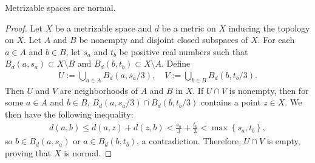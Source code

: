 \begin{thm}
    Metrizable spaces are normal.
\end{thm}
\begin{proof}
    Let $X$ be a metrizable space and $d$ be a metric on $X$ inducing the topology on $X$.
    Let $A$ and $B$ be nonempty and disjoint closed subspaces of $X$.
    For each $a\in A$ and $b\in B$, let $s_a$ and $t_b$ be positive real numbers such that $B_d(a, s_a)\subset X\setminus B$ and $B_d(b, t_b)\subset X\setminus A$.
    Define
    \begin{align*}
        U:=\bigcup_{a\in A}B_d(a, s_a/3),\quad V:=\bigcup_{b\in B}B_d(b, t_b/3).
    \end{align*}
    Then $U$ and $V$ are neighborhoods of $A$ and $B$ in $X$.
    If $U\cap V$ is nonempty, then for some $a\in A$ and $b\in B$, $B_d(a, s_a/3)\cap B_d(b, t_b/3)$ contains a point $z\in X$.
    We then have the following inequality:
    \begin{align*}
        d(a, b)\leq d(a, z)+d(z, b)<\frac{s_a}{3}+\frac{t_b}{3}<\max\left\{s_a, t_b\right\},
    \end{align*}
    so $b\in B_d(a, s_a)$ or $a\in B_d(b, t_b)$, a contradiction.
    Therefore, $U\cap V$ is empty, proving that $X$ is normal.
\end{proof}

